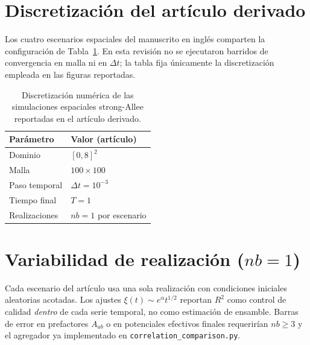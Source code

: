 \section{Discretización del artículo derivado}
Los cuatro escenarios espaciales del manuscrito en inglés comparten la configuración de Tabla~\ref{tab:discretization_paper}. En esta revisión no se ejecutaron barridos de convergencia en malla ni en $\Delta t$; la tabla fija únicamente la discretización empleada en las figuras reportadas.

\begin{table}[H]
\centering
\begin{tabular}{ll}
\toprule
Parámetro & Valor (artículo) \\
\midrule
Dominio & $[0,8]^2$ \\
Malla & $100\times100$ \\
Paso temporal & $\Delta t=10^{-3}$ \\
Tiempo final & $T=1$ \\
Realizaciones & $nb=1$ por escenario \\
\bottomrule
\end{tabular}
\caption{Discretización numérica de las simulaciones espaciales strong-Allee reportadas en el artículo derivado.}
\label{tab:discretization_paper}
\end{table}

\section{Variabilidad de realización ($nb=1$)}
Cada escenario del artículo usa una sola realización con condiciones iniciales aleatorias acotadas. Los ajustes $\xi(t)\sim e^{\alpha}t^{1/2}$ reportan $R^2$ como control de calidad \emph{dentro} de cada serie temporal, no como estimación de ensamble. Barras de error en prefactores $A_{ab}$ o en potenciales efectivos finales requerirían $nb\geq 3$ y el agregador ya implementado en \texttt{correlation\_comparison.py}.

